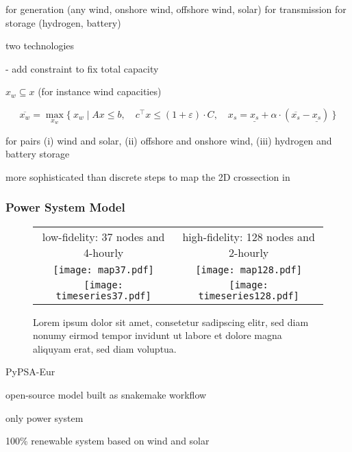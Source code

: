 for generation (any wind, onshore wind, offshore wind, solar)
for transmission
for storage (hydrogen, battery)

two technologies

- add constraint to fix total capacity

$x_w\subseteq x$ (for instance wind capacities)

\begin{equation}
    \overline{x_w} = \max_{x_w}\{\:x_w \mid Ax\leq b,\quad c^\top x\leq (1+\varepsilon)\cdot C, \quad x_s = \underline{x_s} + \alpha \cdot (\overline{x_s}-\underline{x_s}) \:\}
\end{equation}

for pairs
(i) wind and solar,
(ii) offshore and onshore wind,
(iii) hydrogen and battery storage

more sophisticated than discrete steps to map the 2D crossection in \cite{pedersen_modeling_2020}


\subsubsection{Power System Model}


\begin{SCfigure}
    \begin{tabular}{cc}
        \footnotesize low-fidelity: 37 nodes and 4-hourly & \footnotesize high-fidelity: 128 nodes and 2-hourly \\
        \texttt{[image: map37.pdf]} &
        \texttt{[image: map128.pdf]} \\
        \texttt{[image: timeseries37.pdf]} &
        \texttt{[image: timeseries128.pdf]} \\
    \end{tabular}
    \caption{Lorem ipsum dolor sit amet, consetetur sadipscing elitr, sed diam nonumy eirmod tempor invidunt ut labore et dolore magna aliquyam erat, sed diam voluptua.}
\end{SCfigure}

PyPSA-Eur \cite{pypsa} \cite{pypsaeur} \cite{hoersch_spatial_2017} 

open-source model built as snakemake workflow \cite{snakemake}

only power system

100\% renewable system based on wind and solar

